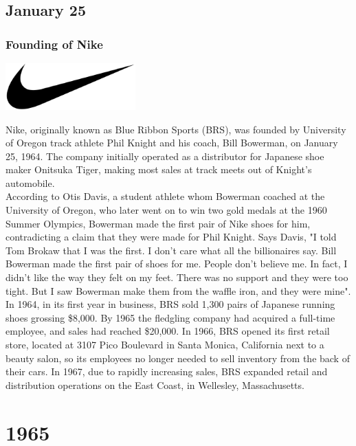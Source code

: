 \documentclass[11pt]{report}
\begin{document}
\section{January 25}
\subsection{Founding of Nike}
\vspace{2mm}\begin{center}\includegraphics[width=5cm]{./img/nikeLogo.jpg}\end{center}
Nike, originally known as Blue Ribbon Sports (BRS), was founded by University of Oregon track athlete Phil Knight and his coach, Bill Bowerman, on January 25, 1964. The company initially operated as a distributor for Japanese shoe maker Onitsuka Tiger, making most sales at track meets out of Knight's automobile.\\ \indent According to Otis Davis, a student athlete whom Bowerman coached at the University of Oregon, who later went on to win two gold medals at the 1960 Summer Olympics, Bowerman made the first pair of Nike shoes for him, contradicting a claim that they were made for Phil Knight. Says Davis, "I told Tom Brokaw that I was the first. I don't care what all the billionaires say. Bill Bowerman made the first pair of shoes for me. People don't believe me. In fact, I didn't like the way they felt on my feet. There was no support and they were too tight. But I saw Bowerman make them from the waffle iron, and they were mine".\\ \indent In 1964, in its first year in business, BRS sold 1,300 pairs of Japanese running shoes grossing \$8,000. By 1965 the fledgling company had acquired a full-time employee, and sales had reached \$20,000. In 1966, BRS opened its first retail store, located at 3107 Pico Boulevard in Santa Monica, California next to a beauty salon, so its employees no longer needed to sell inventory from the back of their cars. In 1967, due to rapidly increasing sales, BRS expanded retail and distribution operations on the East Coast, in Wellesley, Massachusetts.

\chapter{1965}
\end{document}
